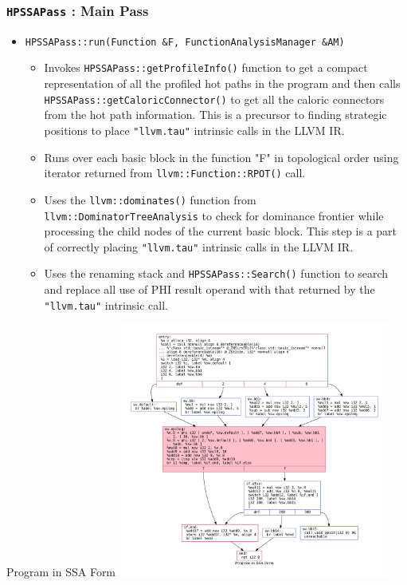 \documentclass[aspectratio=169, compress]{beamer}
\begin{document}
\begin{frame}
	\frametitle{\texttt{HPSSAPass} : Main Pass}
	\begin{itemize}
		\item \texttt{HPSSAPass::run(Function &F, FunctionAnalysisManager &AM)} 
		\begin{itemize}
			\footnotesize
			\item Invokes \texttt{HPSSAPass::getProfileInfo()} function to get a compact representation of all the profiled \color{red} hot paths \color{black} in the program and then calls \texttt{HPSSAPass::getCaloricConnector()} to get all the caloric connectors from the \color{red} hot path \color{black} information. This is a precursor to finding strategic positions to place \texttt{"llvm.tau"} intrinsic calls in the LLVM IR. \pause
			\item Runs over each basic block in the function "F" in topological order using iterator returned from \texttt{llvm::Function::RPOT()} call.
			\item Uses the \texttt{llvm::dominates()} function from \texttt{llvm::DominatorTreeAnalysis} to check for dominance frontier while processing the child nodes of the current basic block. This step is a part of correctly placing \texttt{"llvm.tau"} intrinsic calls in the LLVM IR. \pause
			\item Uses the renaming stack and \texttt{HPSSAPass::Search()} function to search and replace all use of PHI result operand with that returned by the \texttt{"llvm.tau"} intrinsic call.
		\end{itemize}
	\end{itemize}
\end{frame}

\begin{frame}{Program in SSA Form}
	\centering
	\includegraphics[width=9cm, height=8.35cm]{dotfiles/baseline.dot.pdf}
\end{frame}
\end{document}
